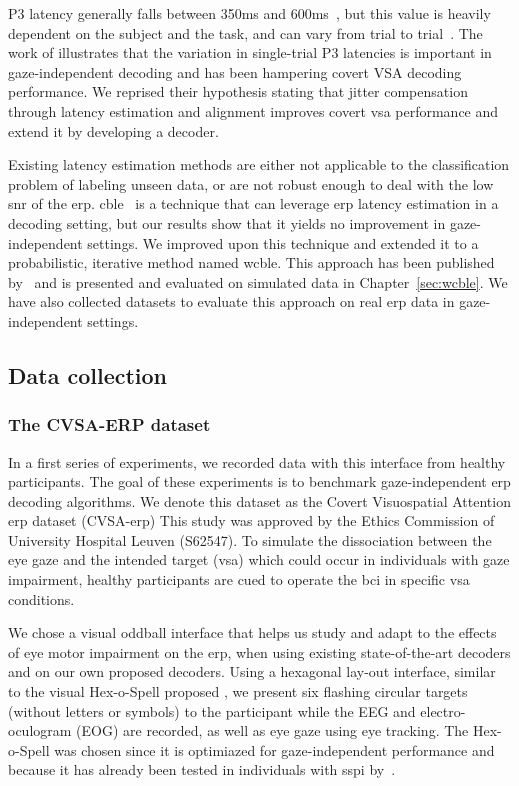 P3 latency generally falls between 350ms and 600ms~\cite{Luck2014}, but this
value is heavily dependent on the subject and the task, and can vary from trial
to trial~\cite{Ouyang2017}.
The work of \cite{Arico2014} illustrates that the variation in single-trial P3
latencies is important in gaze-independent decoding and has been hampering covert
VSA decoding performance.
We reprised their hypothesis stating that jitter compensation through latency
estimation and alignment improves
covert \ac{vsa} performance and extend it by developing a decoder.

Existing latency estimation methods are either not applicable to the
classification problem of labeling unseen data, or are not robust enough to
deal with the low \ac{snr} of the \ac{erp}.
\Ac{cble}~\cite{Mowla2017} is a technique that can leverage
\ac{erp} latency estimation in a decoding setting, but our results show that it
yields no improvement in gaze-independent settings.
We improved upon this technique and extended it to a probabilistic, iterative
method named \ac{wcble}.
This approach has been published by~\cite{VanDenKerchove2024} and is presented
and evaluated on simulated data in Chapter~\ref{sec:wcble}.
We have also collected datasets to evaluate this approach on real \ac{erp} data
in gaze-independent settings.

\subsection{Data collection}

\subsubsection{The CVSA-ERP dataset}

In a first series of experiments, we recorded data with this interface from healthy participants.
The goal of these experiments is to benchmark
gaze-independent \ac{erp} decoding algorithms.
We denote this dataset as the Covert Visuospatial Attention \ac{erp} dataset
(CVSA-\ac{erp})
This study was approved by the Ethics Commission of University Hospital Leuven
(S62547).
To simulate the dissociation between the eye gaze and the
intended target (\ac{vsa}) which could occur in individuals with gaze
impairment, healthy participants are cued to operate the \ac{bci} in specific
\ac{vsa} conditions.


We chose a visual oddball interface that helps us study and adapt
to the effects of eye motor impairment on the \ac{erp}, when using existing state-of-the-art
decoders and on our own proposed decoders.
Using a hexagonal lay-out interface, similar to the visual Hex-o-Spell proposed
\textcite{Treder2010}, we present six flashing circular targets
(without letters or symbols) to the participant while the EEG and
electro-oculogram (EOG) are recorded, as well as eye gaze using eye tracking.
The Hex-o-Spell was chosen since it is optimiazed for gaze-independent
performance and because it has already been tested in individuals with
\ac{sspi} by~\textcite{Severens2014}.

